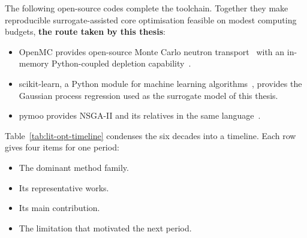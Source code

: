 The following open-source codes complete the toolchain. Together they
make reproducible surrogate-assisted core optimisation feasible on modest
computing budgets, \textbf{the route taken by this thesis}:

\begin{itemize}
  \item OpenMC provides open-source Monte Carlo neutron
        transport~\cite{romano_openmc_2015} with an in-memory
        Python-coupled depletion capability~\cite{romano_2021_depletion}.

  \item scikit-learn, a Python module for machine learning
        algorithms~\cite{pedregosa_sklearn_2011}, provides the Gaussian
        process regression used as the surrogate model of this thesis.

  \item pymoo provides NSGA-II and its relatives in the same
        language~\cite{blank_deb_2020}.
\end{itemize}

Table~\ref{tab:lit-opt-timeline} condenses the six decades into a
timeline. Each row gives four items for one period:

\begin{itemize}
  \item The dominant method family.

  \item Its representative works.

  \item Its main contribution.

  \item The limitation that motivated the next period.
\end{itemize}

